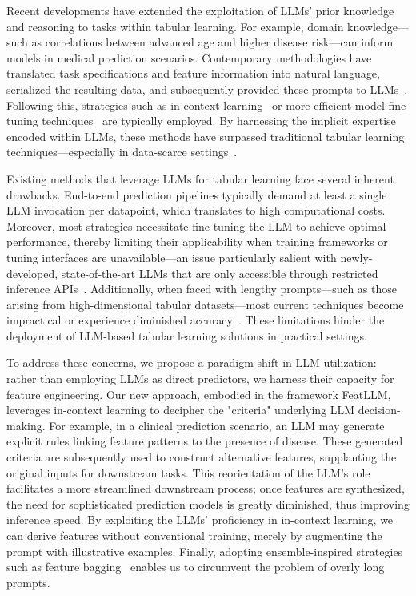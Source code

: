 Recent developments have extended the exploitation of LLMs’ prior knowledge and reasoning to tasks within tabular learning. For example, domain knowledge—such as correlations between advanced age and higher disease risk—can inform models in medical prediction scenarios. Contemporary methodologies have translated task specifications and feature information into natural language, serialized the resulting data, and subsequently provided these prompts to LLMs~\cite{dinh2022lift,wang2023anypredict}. Following this, strategies such as in-context learning~\cite{nam2023semi} or more efficient model fine-tuning techniques~\cite{dinh2022lift,hegselmann2023tabllm} are typically employed. By harnessing the implicit expertise encoded within LLMs, these methods have surpassed traditional tabular learning techniques—especially in data-scarce settings~\cite{hegselmann2023tabllm}.

Existing methods that leverage LLMs for tabular learning face several inherent drawbacks. End-to-end prediction pipelines typically demand at least a single LLM invocation per datapoint, which translates to high computational costs. Moreover, most strategies necessitate fine-tuning the LLM to achieve optimal performance, thereby limiting their applicability when training frameworks or tuning interfaces are unavailable—an issue particularly salient with newly-developed, state-of-the-art LLMs that are only accessible through restricted inference APIs~\cite{anil2023palm,openai2023gpt4}. Additionally, when faced with lengthy prompts—such as those arising from high-dimensional tabular datasets—most current techniques become impractical or experience diminished accuracy~\cite{liu2023lost}. These limitations hinder the deployment of LLM-based tabular learning solutions in practical settings.

To address these concerns, we propose a paradigm shift in LLM utilization: rather than employing LLMs as direct predictors, we harness their capacity for feature engineering. Our new approach, embodied in the framework \textsf{FeatLLM}, leverages in-context learning to decipher the "criteria" underlying LLM decision-making. For example, in a clinical prediction scenario, an LLM may generate explicit rules linking feature patterns to the presence of disease. These generated criteria are subsequently used to construct alternative features, supplanting the original inputs for downstream tasks. This reorientation of the LLM's role facilitates a more streamlined downstream process; once features are synthesized, the need for sophisticated prediction models is greatly diminished, thus improving inference speed. By exploiting the LLMs' proficiency in in-context learning, we can derive features without conventional training, merely by augmenting the prompt with illustrative examples. Finally, adopting ensemble-inspired strategies such as feature bagging~\cite{breiman2001random} enables us to circumvent the problem of overly long prompts.

